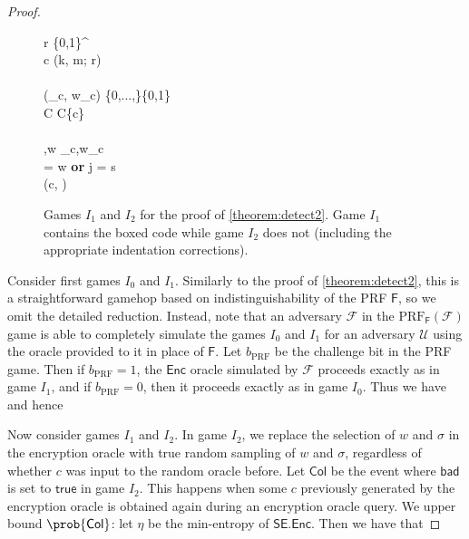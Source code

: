 \begin{proof}
\begin{figure}
\begin{pchstack}
{	\pcind r \sample \{0,1\}^ \\
	\pcind c \leftarrow {}(k, m; r) \\
	\pcind {} \\
	\pcind \pcind (\sigma_c, w_c) \sample \{0,...,\}\times \{0,1\} \\
	\pcind \pcind C \leftarrow C\cup \{c\} \\
	\pcind {} \\
	\pcind \sigma,w \leftarrow \sigma_c,w_c \\
	\pcuntil \kappa[\sigma] = w \textbf{ or } j = s \\
	\pcreturn (c, \tau)
}
\end{pchstack}
\caption[Games $I_1$ and $I_2$ for the proof of \autoref{theorem:detect2}]{Games $I_1$ and $I_2$ for the proof of \autoref{theorem:detect2}. Game $I_1$ contains the boxed code while game $I_2$ does not (including the appropriate indentation corrections).}
\label{game:I12}
\end{figure}

Consider first games $I_0$ and $I_1$. Similarly to the proof of \autoref{theorem:detect2}, this is a straightforward gamehop based on indistinguishability of the PRF $\mathsf{F}$, so we omit the detailed reduction.  Instead, note that an adversary $\mathcal{F}$ in the $\mathrm{PRF}_\mathsf{F}(\mathcal{F})$ game is able to completely simulate the games $I_0$ and $I_1$ for an adversary $\mathcal{U}$ using the oracle provided to it in place of $\mathsf{F}$. Let $b_\mathrm{PRF}$ be the challenge bit in the PRF game. Then if $b_\mathrm{PRF}=1$, the $\mathsf{Enc}$ oracle simulated by $\mathcal{F}$ proceeds exactly as in game $I_1$, and if  $b_\mathrm{PRF}=0$, then it proceeds exactly as in game $I_0$. Thus we have
and hence

Now consider games $I_1$ and $I_2$. In game $I_2$, we replace the selection of $w$ and $\sigma$ in the encryption oracle with true random sampling of $w$ and $\sigma$, regardless of whether $c$ was input to the random oracle before. Let $\mathsf{Col}$ be the event where $\mathsf{bad}$ is set to $\mathsf{true}$ in game $I_2$. This happens when some $c$ previously generated by the encryption oracle is obtained again during an encryption oracle query. We upper bound $\prob{\mathsf{Col}}$: let $\eta$ be the min-entropy of $\mathsf{SE.Enc}$. Then we have that


\end{proof}
